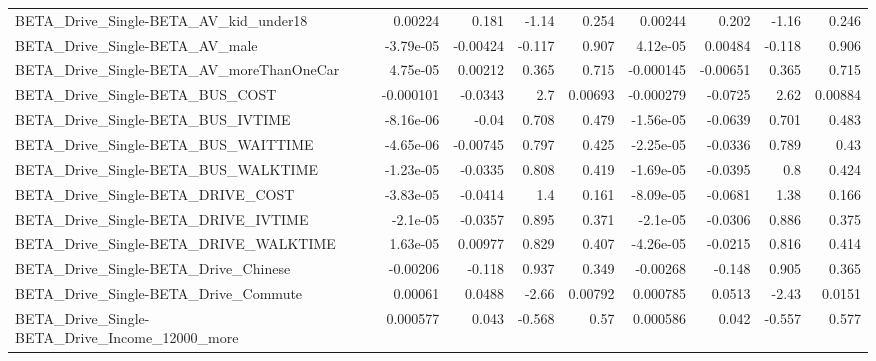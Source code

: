 \begin{tabular}{lrrrrrrrr}
BETA\_Drive\_Single-BETA\_AV\_kid\_under18              &     0.00224 &        0.181 &    -1.14 &    0.254 &    0.00244 &       0.202 &        -1.16 &         0.246 \\
BETA\_Drive\_Single-BETA\_AV\_male                     &   -3.79e-05 &     -0.00424 &   -0.117 &    0.907 &   4.12e-05 &     0.00484 &       -0.118 &         0.906 \\
BETA\_Drive\_Single-BETA\_AV\_moreThanOneCar           &    4.75e-05 &      0.00212 &    0.365 &    0.715 &  -0.000145 &    -0.00651 &        0.365 &         0.715 \\
BETA\_Drive\_Single-BETA\_BUS\_COST                    &   -0.000101 &      -0.0343 &      2.7 &  0.00693 &  -0.000279 &     -0.0725 &         2.62 &       0.00884 \\
BETA\_Drive\_Single-BETA\_BUS\_IVTIME                  &   -8.16e-06 &        -0.04 &    0.708 &    0.479 &  -1.56e-05 &     -0.0639 &        0.701 &         0.483 \\
BETA\_Drive\_Single-BETA\_BUS\_WAITTIME                &   -4.65e-06 &     -0.00745 &    0.797 &    0.425 &  -2.25e-05 &     -0.0336 &        0.789 &          0.43 \\
BETA\_Drive\_Single-BETA\_BUS\_WALKTIME                &   -1.23e-05 &      -0.0335 &    0.808 &    0.419 &  -1.69e-05 &     -0.0395 &          0.8 &         0.424 \\
BETA\_Drive\_Single-BETA\_DRIVE\_COST                  &   -3.83e-05 &      -0.0414 &      1.4 &    0.161 &  -8.09e-05 &     -0.0681 &         1.38 &         0.166 \\
BETA\_Drive\_Single-BETA\_DRIVE\_IVTIME                &    -2.1e-05 &      -0.0357 &    0.895 &    0.371 &   -2.1e-05 &     -0.0306 &        0.886 &         0.375 \\
BETA\_Drive\_Single-BETA\_DRIVE\_WALKTIME              &    1.63e-05 &      0.00977 &    0.829 &    0.407 &  -4.26e-05 &     -0.0215 &        0.816 &         0.414 \\
BETA\_Drive\_Single-BETA\_Drive\_Chinese               &    -0.00206 &       -0.118 &    0.937 &    0.349 &   -0.00268 &      -0.148 &        0.905 &         0.365 \\
BETA\_Drive\_Single-BETA\_Drive\_Commute               &     0.00061 &       0.0488 &    -2.66 &  0.00792 &   0.000785 &      0.0513 &        -2.43 &        0.0151 \\
BETA\_Drive\_Single-BETA\_Drive\_Income\_12000\_more     &    0.000577 &        0.043 &   -0.568 &     0.57 &   0.000586 &       0.042 &       -0.557 &         0.577 \\

\end{tabular}
